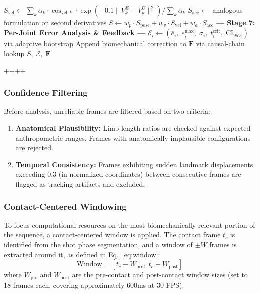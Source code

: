\documentclass[pdflatex,sn-mathphys-num]{sn-jnl}
\theoremstyle{thmstyleone}%
\theoremstyle{thmstyletwo}%
\theoremstyle{thmstylethree}%
\begin{document}
\begin{algorithm}[htbp]
\begin{algorithmic}[1]
\State $S_{\text{vel}} \leftarrow {\sum_k \alpha_k \cdot \cos_{\text{vel},k} \cdot \exp(-0.1\|V_k^E - V_k^U\|^2)}/{\sum_k \alpha_k}$
\State $S_{\text{acc}} \leftarrow$ analogous formulation on second derivatives
\State $S \leftarrow w_p \cdot S_{\text{pose}} + w_v \cdot S_{\text{vel}} + w_a \cdot S_{\text{acc}}$
\Statex
\State \textbf{--- Stage 7: Per-Joint Error Analysis \& Feedback ---}
    \State $\mathcal{E}_i \leftarrow (\bar{e}_i,\; e_i^{\max},\; \sigma_i,\; t_i^{\text{crit}},\; \text{CI}_{95\%})$ via adaptive bootstrap
        \State Append biomechanical correction to $\mathbf{F}$ via causal-chain lookup
    \EndIf
\EndFor
\State \Return $S,\; \mathcal{E},\; \mathbf{F}$
\end{algorithmic}
\end{algorithm}++++         

\subsubsection{Confidence Filtering}
Before analysis, unreliable frames are filtered based on two criteria:
\begin{enumerate}
    \item \textbf{Anatomical Plausibility:} Limb length ratios are checked against expected anthropometric ranges. Frames with anatomically implausible configurations are rejected.
    \item \textbf{Temporal Consistency:} Frames exhibiting sudden landmark displacements exceeding 0.3 (in normalized coordinates) between consecutive frames are flagged as tracking artifacts and excluded.
\end{enumerate}

\subsubsection{Contact-Centered Windowing}
To focus computational resources on the most biomechanically relevant portion of the sequence, a contact-centered window is applied. The contact frame $t_c$ is identified from the shot phase segmentation, and a window of $\pm W$ frames is extracted around it, as defined in Eq.~\eqref{eq:window}:
\begin{equation}
\text{Window} = [t_c - W_{\text{pre}}, \; t_c + W_{\text{post}}]
\label{eq:window}
\end{equation}
\noindent where $W_{\text{pre}}$ and $W_{\text{post}}$ are the pre-contact and post-contact window sizes (set to 18 frames each, covering approximately 600ms at 30 FPS).
\end{document}
